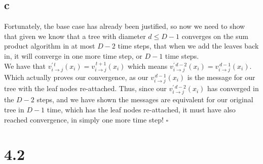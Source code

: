 \documentclass[12pt]{article}
\begin{document}
\subsection{c}
Fortunately, the base case has already been justified, so now we need to show that given we know that a tree with diameter $d \le D-1$ converges on the sum product algorithm in at most $D-2$ time steps, that when we add the leaves back in, it will converge in one more time step, or $D-1$ time steps.
\\
We have that $v^{\prime \, t}_{i\rightarrow j}(x_i) =v^{\, t+1}_{i\rightarrow j}(x_i)$ which means $v^{\prime \, d-2}_{i\rightarrow j}(x_i) =v^{\, d-1}_{i\rightarrow j}(x_i)$. Which actually proves our convergence, as our $v^{\, d-1}_{i\rightarrow j}(x_i)$ is the message for our tree with the leaf nodes re-attached. Thus, since our $v^{\prime \, d-2}_{i\rightarrow j}(x_i)$ has converged in the $D-2$ steps, and we have shown the messages are equivalent for our original tree in $D-1$ time, which has the leaf nodes re-attached, it must have also reached convergence, in simply one more time step! $\square$
\section{4.2}
\end{document}
